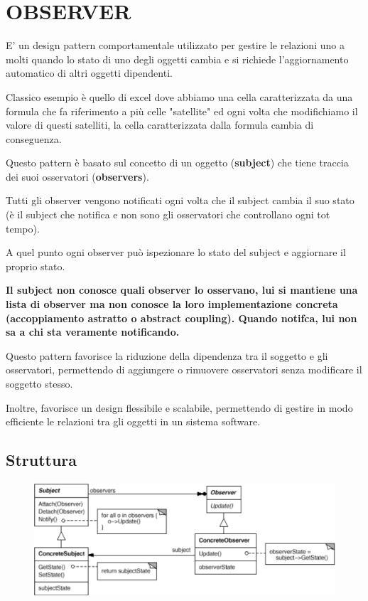 
\chapter{OBSERVER}

E' un design pattern comportamentale utilizzato per gestire le relazioni uno a molti quando lo stato di uno degli oggetti cambia e si richiede l'aggiornamento automatico di 
altri oggetti dipendenti.
\medskip

Classico esempio è quello di excel dove abbiamo una cella caratterizzata da una formula che fa riferimento a più celle "satellite" ed ogni volta che modifichiamo il
valore di questi satelliti, la cella caratterizzata dalla formula cambia di conseguenza.
\medskip

Questo pattern è basato sul concetto di un oggetto (\textbf{subject}) che tiene traccia dei suoi osservatori (\textbf{observers}).

Tutti gli observer vengono notificati ogni volta che il subject cambia il suo stato (è il subject che notifica e non sono gli osservatori che controllano ogni tot tempo).

A quel punto ogni observer può ispezionare lo stato del subject e aggiornare il proprio stato.

\medskip
\textbf{Il subject non conosce quali observer lo osservano, lui si mantiene una lista di observer ma non conosce la loro implementazione concreta 
(\textbf{accoppiamento astratto} o abstract coupling).
Quando notifca, lui non sa a chi sta veramente notificando.}
\medskip

Questo pattern favorisce la riduzione della dipendenza tra il soggetto e gli osservatori, permettendo di aggiungere o rimuovere osservatori senza modificare il 
soggetto stesso. 

Inoltre, favorisce un design flessibile e scalabile, permettendo di gestire in modo efficiente le relazioni tra gli oggetti in un sistema software.

\section{Struttura}

\begin{figure}[h]
    \centering
    \includegraphics[width=0.5\linewidth]{../../immagini/observer_publishSubscribe/struttura_observer}
\end{figure}

